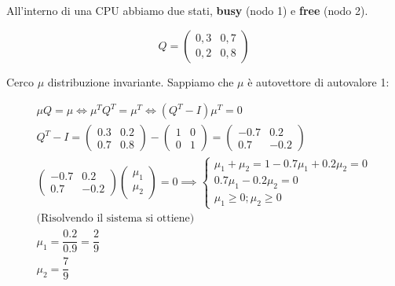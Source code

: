 \begin{exrc}
	All'interno di una CPU abbiamo due stati, \textbf{busy} (nodo 1) e \textbf{free} (nodo 2).
	
	\begin{equation*}
	Q = \begin{pmatrix}
	0,3 & 0,7 \\
	0,2 & 0,8
	\end{pmatrix}
	\end{equation*}
	
	Cerco $ \mu $ distribuzione invariante. Sappiamo che $ \mu $ è autovettore di autovalore 1:
	
	\begin{equation*}
	\begin{aligned}
	\mu Q = \mu \iff \mu^T Q^T = \mu^T \iff (Q^T -I)\mu^T = 0 \\
	Q^T - I = \begin{pmatrix}
	0.3 & 0.2 \\
	0.7 & 0.8
	\end{pmatrix} - \begin{pmatrix}
	1 & 0 \\ 0 & 1
	\end{pmatrix} = \begin{pmatrix}
	-0.7 & 0.2 \\
	0.7 & -0.2
	\end{pmatrix} \\
	\begin{pmatrix}
	-0.7 & 0.2 \\
	0.7 & -0.2
	\end{pmatrix} \begin{pmatrix}
	\mu_1 \\ \mu_2
	\end{pmatrix} = 0 
	\implies \begin{cases}
	\mu_1 + \mu_2 = 1
	-0.7\mu_1 + 0.2 \mu_2 = 0 \\
	0.7\mu_1 - 0.2 \mu_2 = 0 \\
	\mu_1 \geq 0; \mu_2 \geq 0
	\end{cases} \\
	\text{(Risolvendo il sistema si ottiene)} \\
	\mu_1 = \dfrac{0.2}{0.9} = \dfrac{2}{9} \\
	\mu_2 = \dfrac{7}{9}
	\end{aligned}
	\end{equation*}
\end{exrc}

